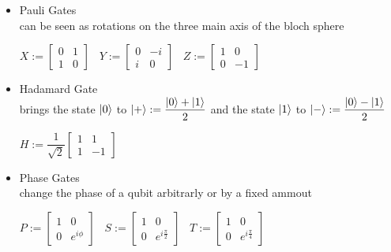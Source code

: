 \documentclass{article}
\begin{document}
\begin{itemize}

	\item Pauli Gates\\
	      can be seen as rotations on the three main axis of the bloch
	      sphere
	      \begin{center}
		      $	X:=\begin{bmatrix}
				      0 & 1 \\
				      1 & 0
			      \end{bmatrix}
			      \hspace{10pt}
			      Y:=\begin{bmatrix}
				      0 & -i \\
				      i & 0
			      \end{bmatrix}
			      \hspace{10pt}
			      Z:=\begin{bmatrix}
				      1 & 0  \\
				      0 & -1
			      \end{bmatrix}$
	      \end{center}


	\item Hadamard Gate\\
	      brings the state $\ket{0}$ to
	      $\ket{+} := \dfrac{\ket{0}+\ket{1}}{2}$
	      and the state $\ket{1}$ to $\ket{-} := \dfrac{\ket{0}-\ket{1}}{2}$
	      \begin{center}
		      $	H:=\dfrac{1}{\sqrt{2}}\begin{bmatrix}
				      1 & 1  \\
				      1 & -1
			      \end{bmatrix}$
	      \end{center}

	\item Phase Gates \\
	      change the phase of a qubit arbitrarly or by a fixed ammout
	      \begin{center}
		      $	P:=\begin{bmatrix}
				      1 & 0         \\
				      0 & e^{i\phi}
			      \end{bmatrix}
			      \hspace{10pt}
			      S:=\begin{bmatrix}
				      1 & 0                   \\
				      0 & e^{i\tfrac{\pi}{2}}
			      \end{bmatrix}
			      \hspace{10pt}
			      T:=\begin{bmatrix}
				      1 & 0                   \\
				      0 & e^{i\tfrac{\pi}{4}}
			      \end{bmatrix}$
	      \end{center}
\end{itemize}
\end{document}
